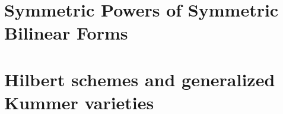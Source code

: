 \documentclass[letterpaper]{amsart}
\begin{document}








\newpage

\tableofcontents

\pagebreak
{} 



\newpage
\part{Symmetric Powers of Symmetric Bilinear Forms}

\newpage
\part{Hilbert schemes and generalized Kummer varieties}






\label{integralcohomology}





\newpage
\end{document}
